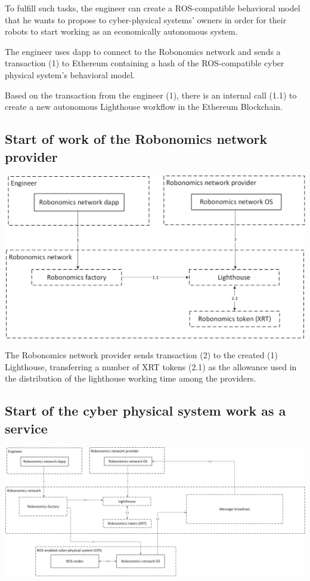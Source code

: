 \documentclass{article}
\begin{document}
To fulfill such tasks, the engineer can create a ROS-compatible behavioral model that he wants to propose to cyber-physical systems’ owners in order for their robots to start working as an economically autonomous system.

The engineer uses dapp to connect to the Robonomics network and sends a transaction (1) to Ethereum containing a hash of the ROS-compatible cyber physical system’s behavioral model.

Based on the transaction from the engineer (1), there is an internal call (1.1) to create a new autonomous Lighthouse workflow in the Ethereum Blockchain.

\subsection{Start of work of the Robonomics network provider}

\includegraphics[width=1\textwidth]{step-by-step-2.png}

The Robonomics network provider sends transaction (2) to the created (1) Lighthouse, transferring a number of XRT tokens (2.1) as the allowance used in the distribution of the lighthouse working time among the providers.

\subsection{Start of the cyber physical system work as a service}

\includegraphics[width=1\textwidth]{step-by-step-3.png}
\end{document}
